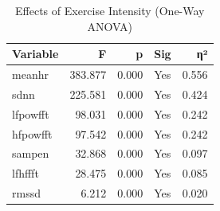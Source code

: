 \begin{table}[htbp]
\centering
\caption{Effects of Exercise Intensity (One-Way ANOVA)}
\label{tab:table_anova_intensity}
\small
\begin{tabular}{lrrlr}
\toprule
Variable & F & p & Sig & η² \\
\midrule
meanhr & 383.877 & 0.000 & Yes & 0.556 \\
sdnn & 225.581 & 0.000 & Yes & 0.424 \\
lfpowfft & 98.031 & 0.000 & Yes & 0.242 \\
hfpowfft & 97.542 & 0.000 & Yes & 0.242 \\
sampen & 32.868 & 0.000 & Yes & 0.097 \\
lfhffft & 28.475 & 0.000 & Yes & 0.085 \\
rmssd & 6.212 & 0.000 & Yes & 0.020 \\
\bottomrule
\end{tabular}

\end{table}
